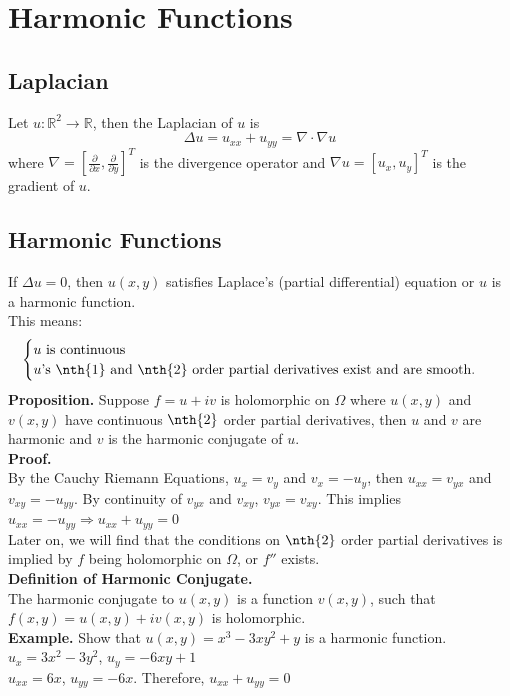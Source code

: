 \documentclass[11pt]{article}
\begin{document}
\newpage
\section{Harmonic Functions}
\subsection{Laplacian}
Let $u: \mathbb{R}^2 \to \mathbb{R}$, then the Laplacian of $u$ is 
$$\Delta u = u_{xx} + u_{yy} = \nabla \cdot \nabla u$$
 where 
$\nabla = [\frac{\partial}{\partial x}, \frac{\partial}{\partial y}]^T$ is the divergence operator and $\nabla u = [u_x, u_y]^T$ is the gradient of $u$. \\
\subsection{Harmonic Functions}
If $\Delta u = 0$, then $u(x, y)$ satisfies Laplace's (partial differential) equation or $u$ is a harmonic function. \\
This means: 
\[ \begin{cases} 
	u \mbox{ is continuous} \\
	u \mbox{'s } \nth{1} \mbox{ and } \nth{2} \mbox{ order partial derivatives exist and are smooth. }
   \end{cases}
\]
\newline
\textbf{Proposition.} Suppose $f = u + iv$ is holomorphic on $\Omega$ where $u(x, y)$ and $v(x, y)$ have continuous $\nth{2}$ order partial derivatives, then $u$ and $v$ are harmonic and $v$ is the harmonic conjugate of $u$. \\
\textbf{Proof.} \\
By the Cauchy Riemann Equations, $u_x = v_y$ and $v_x = -u_y$, then $u_{xx} = v_{yx}$ and $v_{xy} = -u_{yy}$. By continuity of $v_{yx}$ and $v_{xy}$, $v_{yx} = v_{xy}$. This implies $u_{xx} = -u_{yy} \Rightarrow u_{xx} + u_{yy} = 0$ \\
Later on, we will find that the conditions on $\nth{2}$ order partial derivatives is implied by $f$ being holomorphic on $\Omega$, or $f''$ exists. \\
\newline
\textbf{Definition of Harmonic Conjugate.} \\
The harmonic conjugate to $u(x,y)$ is a function $v(x,y)$, such that $f(x,y) = u(x,y) + iv(x,y)$ is holomorphic. \\

\textbf{Example.} Show that $u(x, y) = x^3 -3xy^2 + y$ is a harmonic function. \\
$u_x = 3x^2 - 3y^2$, $u_y = -6xy + 1$ \\
$u_{xx} = 6x$, $u_{yy} = -6x$. Therefore, $u_{xx} + u_{yy} = 0$ \\
\end{document}
